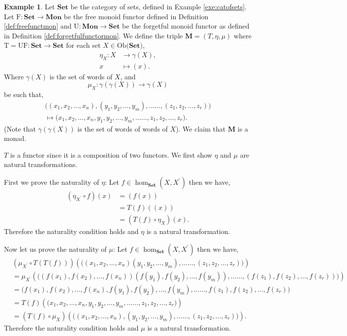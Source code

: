 \documentclass[11pt,a4paper]{article}
\theoremstyle{definition}
\newtheorem{example}[thm]{Example}
\newcommand\ho[3][]{\hom_{#1}(#2,#3)}
\newcommand\ob[1]{\mathrm{Ob(}#1\mathrm{)}}
\newcommand\func[3]{\mathrm{#1}\colon#2\rightarrow#3}
\numberwithin{equation}{section}
\begin{document}
\begin{example}
    \label{exe:monadmonoid1}
    Let $\mathbf{Set}$ be the category of sets, defined in Example \ref{exe:catofsets}. Let $\mathrm{F}\colon\mathbf{Set}\to\mathbf{Mon}$ be the free monoid functor defined in Definition \ref{def:freefunctmon} and $\mathrm{U}\colon\mathbf{Mon}\to\mathbf{Set}$ be the forgetful monoid functor as defined in Definition \ref{def:forgetfulfunctormon}. We define the triple $\mathbf{M} = (T,\eta,\mu)$ where $\func{T=UF}{\mathbf{Set}}{\mathbf{Set}}$ for each set $X\in\ob{\mathbf{Set}}$,
    \begin{align*}
        \eta_{X}\colon X &\to \gamma(X),\\
        x&\mapsto (x).
    \end{align*}
    Where $\gamma(X)$ is the set of words of $X$, and
    \[\mu_{X}\colon \gamma(\gamma(X)) \to \gamma(X)\] be such that,
    \begin{align*}
       \big ((x_1,x_2,\dots, x_n),(y_1,y_2,\dots,y_m),\dots\dots,(z_1,z_2,\dots,z_r)\big) \\ \mapsto \big(x_1,x_2,\dots,x_n,y_1,y_2,\dots,y_m,\dots\dots,z_1,z_2,\dots,z_r\big).
    \end{align*}
    (Note that $\gamma(\gamma(X))$ is the set of words of words of $X$).
    We claim that $\mathbf{M}$ is a monad. 
    
    $T$ is a functor since it is a composition of two functors. 
    We first show $\eta$ and $\mu$ are natural transformations.
    
    First we prove the naturality of $\eta$: Let $f\in\ho[\mathbf{Set}]{X}{X^\prime}$
    then we have,
    \begin{align*}
        (\eta_{X^\prime} \circ f)(x) &= (f(x)) \\
        &= T(f)((x)) \\
        &= (T(f)\circ \eta_{X})(x).
    \end{align*}
    Therefore the naturality condition holds and $\eta$ is a natural transformation.
    
    Now let us prove the naturality of $\mu$:
    Let $f\in\ho[\mathbf{Set}]{X}{X^\prime}$ then we have,
    \begin{align*}
        &(\mu_{X^\prime} \circ T(T(f)))(\big((x_1,x_2,\dots, x_n)(y_1,y_2,\dots,y_m),\dots\dots,(z_1,z_2,\dots,z_r)\big)) \\
        &= \mu_{X^\prime} (\big((f(x_1),f(x_2),\dots, f(x_n))(f(y_1),f(y_2),\dots,f(y_m)),\dots\dots,(f(z_1),f(z_2),\dots,f(z_r))\big)) \\
        &= \big(f(x_1),f(x_2),\dots, f(x_n),f(y_1),f(y_2),\dots,f(y_m),\dots\dots,f(z_1),f(z_2),\dots,f(z_r)\big) \\
        &= T(f)(\big(x_1,x_2,\dots,x_n,y_1,y_2,\dots,y_m,\dots\dots,z_1,z_2,\dots,z_r\big))\\
        &= (T(f)\circ\mu_{X})(\big((x_1,x_2,\dots, x_n),(y_1,y_2,\dots,y_m),\dots\dots,(z_1,z_2,\dots,z_r)\big)).
    \end{align*}
    Therefore the naturality condition holds and $\mu$ is a natural transformation.


\end{example}
\end{document}
